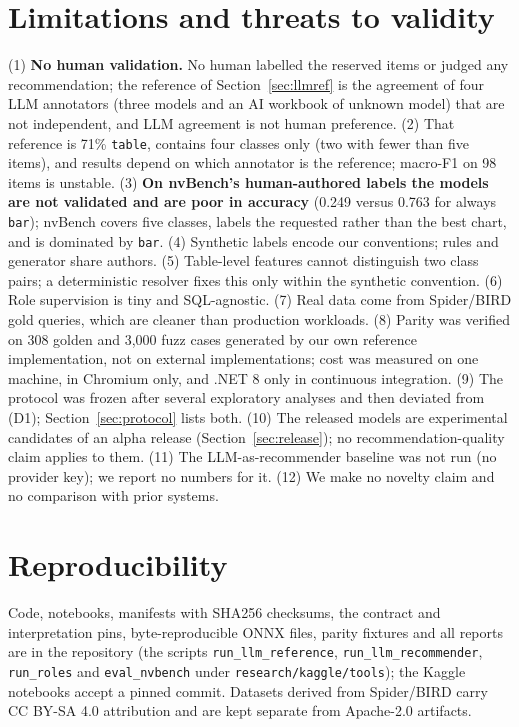 \documentclass[11pt]{article}
\newcommand{\sql}[1]{\texttt{#1}}
\begin{document}
\section{Limitations and threats to validity}
(1) \textbf{No human validation.} No human labelled the reserved items or judged any recommendation; the reference of Section~\ref{sec:llmref} is the agreement of four LLM annotators (three models and an AI workbook of unknown model) that are not independent, and LLM agreement is not human preference. (2) That reference is 71\% \sql{table}, contains four classes only (two with fewer than five items), and results depend on which annotator is the reference; macro-F1 on 98 items is unstable. (3) \textbf{On nvBench's human-authored labels the models are not validated and are poor in accuracy} (0.249 versus 0.763 for always \sql{bar}); nvBench covers five classes, labels the requested rather than the best chart, and is dominated by \sql{bar}. (4) Synthetic labels encode our conventions; rules and generator share authors. (5) Table-level features cannot distinguish two class pairs; a deterministic resolver fixes this only within the synthetic convention. (6) Role supervision is tiny and SQL-agnostic. (7) Real data come from Spider/BIRD gold queries, which are cleaner than production workloads. (8) Parity was verified on 308 golden and 3{,}000 fuzz cases generated by our own reference implementation, not on external implementations; cost was measured on one machine, in Chromium only, and .NET 8 only in continuous integration. (9) The protocol was frozen after several exploratory analyses and then deviated from (D1); Section~\ref{sec:protocol} lists both. (10) The released models are experimental candidates of an alpha release (Section~\ref{sec:release}); no recommendation-quality claim applies to them. (11) The LLM-as-recommender baseline was not run (no provider key); we report no numbers for it. (12) We make no novelty claim and no comparison with prior systems.

\section{Reproducibility}
Code, notebooks, manifests with SHA256 checksums, the contract and interpretation pins, byte-reproducible ONNX files, parity fixtures and all reports are in the repository (the scripts \texttt{run\_llm\_reference}, \texttt{run\_llm\_recommender}, \texttt{run\_roles} and \texttt{eval\_nvbench} under \texttt{research/kaggle/tools}); the Kaggle notebooks accept a pinned commit. Datasets derived from Spider/BIRD carry CC BY-SA 4.0 attribution and are kept separate from Apache-2.0 artifacts.
\end{document}

